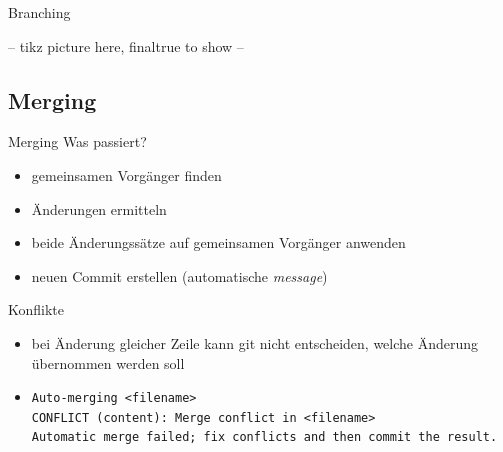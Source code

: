 \documentclass[compress,t,usenames,dvipsnames]{beamer}
\begin{document}
\begin{frame}{Branching}
{
    }
\else
    -- tikz picture here, finaltrue to show --
\fi
\end{frame}

\subsection{Merging}
\begin{frame}{Merging}
    Was passiert?
    \begin{itemize}
        \item gemeinsamen Vorgänger finden
        \item Änderungen ermitteln
        \item beide Änderungssätze auf gemeinsamen Vorgänger anwenden
        \item neuen Commit erstellen (automatische \emph{message})
    \end{itemize}

    Konflikte
    \begin{itemize}
        \item bei Änderung gleicher Zeile kann git nicht entscheiden, welche
            Änderung übernommen werden soll
        \item
            {\scriptsize
            \texttt{Auto-merging <filename>}\\
            \texttt{CONFLICT (content): Merge conflict in <filename>}\\
            \texttt{Automatic merge failed; fix conflicts and then commit the result.}\\
            }
    \end{itemize}
\end{frame}
\end{document}
